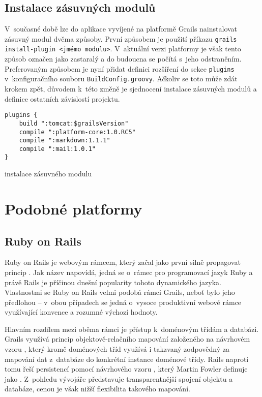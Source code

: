 \subsection{Instalace zásuvných modulů}
V~současné době lze do aplikace vyvíjené na platformě Grails nainstalovat zásuvný modul dvěma způsoby. První způsobem je použití příkazu \texttt{grails install-plugin <jmémo modulu>}. V~aktuální verzi platformy je však tento způsob označen jako zastaralý a do budoucna se počítá s~jeho odstraněním. Preferovaným způsobem je nyní přidat definici rozšíření do sekce \texttt{plugins} v~konfiguračního souboru \texttt{BuildConfig.groovy}\cite{grails-documentation}. Ačkoliv se toto může zdát krokem zpět, důvodem k~této změně je sjednocení instalace zásuvných modulů a definice ostatních závislostí projektu.
\begin{example}
\centering
\begin{lstlisting}
plugins {
    build ":tomcat:$grailsVersion"
    compile ":platform-core:1.0.RC5"
    compile ":markdown:1.1.1"
    compile ":mail:1.0.1"
}
\end{lstlisting}
\caption{instalace zásuvného modulu}
\end{example}

\section{Podobné platformy}

\subsection{Ruby on Rails}
Ruby on Rails je webovým rámcem, který začal jako první silně propagovat princip . Jak název napovídá, jedná se o~rámec pro programovací jazyk Ruby a právě Rails je příčinou dnešní popularity tohoto dynamického jazyka. Vlastnostmi se Ruby on Rails velmi podobá rámci Grails, neboť bylo jeho předlohou -- v~obou případech se jedná o~vysoce produktivní webové rámce využívající konvence a rozumné výchozí hodnoty.

Hlavním rozdílem mezi oběma rámci je přístup k~doménovým třídám a databázi. Grails využívá princip objektově-relačního mapování založeného na návrhovém vzoru , který kromě doménových tříd využívá i takzvaný  zodpovědný za mapování dat z~databáze do konkrétní instance doménové třídy. Rails naproti tomu řeší persistencí pomocí návrhového vzoru , který Martin Fowler definuje jako . \cite{fowler-patterns} Z~pohledu vývojáře představuje  transparentnější spojení objektu a databáze, cenou je však nižší flexibilita takového mapování.


